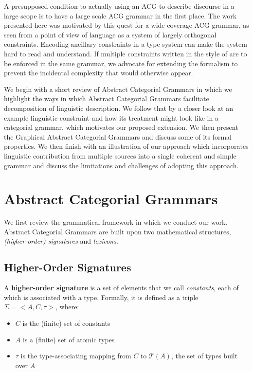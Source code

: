 \documentclass{llncs}
\begin{document}
A presupposed condition to actually using an ACG to describe discourse in a
large scope is to have a large scale ACG grammar in the first place. The work
presented here was motivated by this quest for a wide-coverage ACG grammar, as
seen from a point of view of language as a system of largely orthogonal
constraints. Encoding ancillary constraints in a type system can make the
system hard to read and understand. If multiple constraints written in the
style of \cite{pogodalla2012controlling} are to be enforced in the same
grammar, we advocate for extending the formalism to prevent the incidental
complexity that would otherwise appear.

We begin with a short review of Abstract Categorial Grammars in which we
highlight the ways in which Abstract Categorial Grammars facilitate
decomposition of linguistic description. We follow that by a closer look at an
example linguistic constraint and how its treatment might look like in a
categorial grammar, which motivates our proposed extension. We then present
the Graphical Abstract Categorial Grammars and discuss some of its formal
properties. We then finish with an illustration of our approach which
incorporates linguistic contribution from multiple sources into a single
coherent and simple grammar and discuss the limitations and challenges of
adopting this approach.


\section{Abstract Categorial Grammars}
\label{sec:acg-comp}

We first review the grammatical framework in which we conduct our
work. Abstract Categorial Grammars are built upon two mathematical structures,
\emph{(higher-order) signatures} and \emph{lexicons}.

\subsection{Higher-Order Signatures}
\label{ssec:sig}

A \textbf{higher-order signature} is a set of elements that we call
\emph{constants}, each of which is associated with a type. Formally, it
is defined as a triple $\Sigma = \mathopen{<}A, C, \tau\mathclose{>}$,
where:
\begin{itemize}
  \item $C$ is the (finite) set of constants
  \item $A$ is a (finite) set of atomic types
  \item $\tau$ is the type-associating mapping from $C$ to
    $\mathcal{T}(A)$, the set of types built over $A$
\end{itemize}
\end{document}
